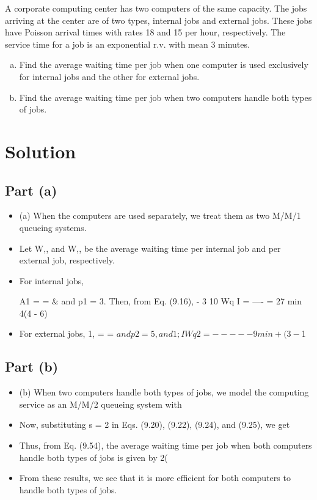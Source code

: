 \documentclass[a4paper12pt]{article}
\begin{document}
\large 





A corporate computing center has two computers of the same capacity. The jobs arriving at the 
center are of two types, internal jobs and external jobs. These jobs have Poisson arrival times 
with rates 18 and 15 per hour, respectively. The service time for a job is an exponential r.v. with 
mean 3 minutes. 
\begin{enumerate}[(a)]
    \item Find the average waiting time per job when one computer is used exclusively for internal 
jobs and the other for external jobs. 
    \item Find the average waiting time per job when two computers handle both types of jobs. 
\end{enumerate}


\section*{Solution}

\subsection*{Part (a)}
\begin{itemize}
    \item (a) When the computers are used separately, we treat them as two M/M/1 queueing systems. 
    
        \item Let W,, and 
W,, be the average waiting time per internal job and per external job, respectively. 

    \item For internal jobs, 

A1 = = & and p1 = 3. Then, from Eq. (9.16), 
- 3 
10 Wq I = ---- = 27 min 4(4 - 6) 
    \item For external jobs, 1, = = $ and p2 = 5, and 
1 
;I Wq2 = ---- - 9 min +(3 - $1 
\end{itemize}


\subsection*{Part (b)}
\begin{itemize}
    \item (b) When two computers handle both types of jobs, we model the computing service as an M/M/2 
queueing system with 
\item Now, substituting s = 2 in Eqs. (9.20), (9.22), (9.24), and (9.25), we get 
\item Thus, from Eq. (9.54), the average waiting time per job when both computers handle both types of jobs 
is given by 
2(%
\item From these results, we see that it is more efficient for both computers to handle both types of jobs.
\end{itemize}
\end{document}
